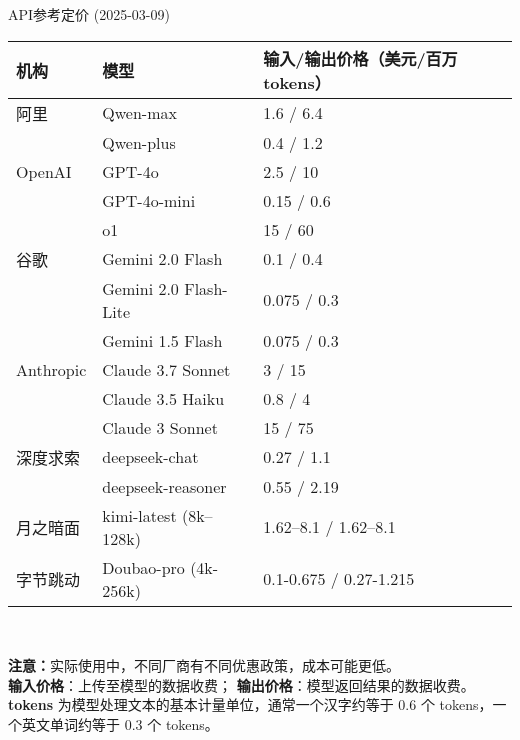 \documentclass{beamer}
\begin{document}
\begin{frame}{API参考定价 (2025-03-09)}
    \scriptsize
    \begin{table}[htbp]
        \centering
        \begin{tabular}{lll}
        \hline
        \textbf{机构} & \textbf{模型} & \textbf{输入/输出价格（美元/百万tokens）} \\
        \hline
        阿里 & Qwen-max & 1.6 / 6.4 \\
             & Qwen-plus & 0.4 / 1.2 \\
        \hline
        OpenAI & GPT-4o & 2.5 / 10 \\
               & GPT-4o-mini & 0.15 / 0.6 \\
               & o1 & 15 / 60 \\
        \hline
        谷歌 & Gemini 2.0 Flash & 0.1 / 0.4 \\
             & Gemini 2.0 Flash-Lite & 0.075 / 0.3 \\
             & Gemini 1.5 Flash & 0.075 / 0.3 \\
        \hline
        Anthropic & Claude 3.7 Sonnet & 3 / 15 \\
                  & Claude 3.5 Haiku & 0.8 / 4 \\
                  & Claude 3 Sonnet & 15 / 75 \\
        \hline
        深度求索 & deepseek-chat & 0.27 / 1.1 \\
                & deepseek-reasoner & 0.55 / 2.19 \\
        \hline
        月之暗面 & kimi-latest (8k–128k) & 1.62–8.1 / 1.62–8.1 \\
        \hline
        字节跳动 & Doubao-pro (4k-256k) & 0.1-0.675 / 0.27-1.215 \\
        \hline
        \end{tabular}
        \\[5pt]
        \begin{flushleft}
            \tiny
            \textbf{注意：}实际使用中，不同厂商有不同优惠政策，成本可能更低。\\
            \textbf{输入价格}：上传至模型的数据收费；
            \textbf{输出价格}：模型返回结果的数据收费。\\
            \textbf{tokens} 为模型处理文本的基本计量单位，通常一个汉字约等于 0.6 个 tokens，一个英文单词约等于 0.3 个 tokens。
            \end{flushleft}
        \end{table}
        
\end{frame}
\end{document}
